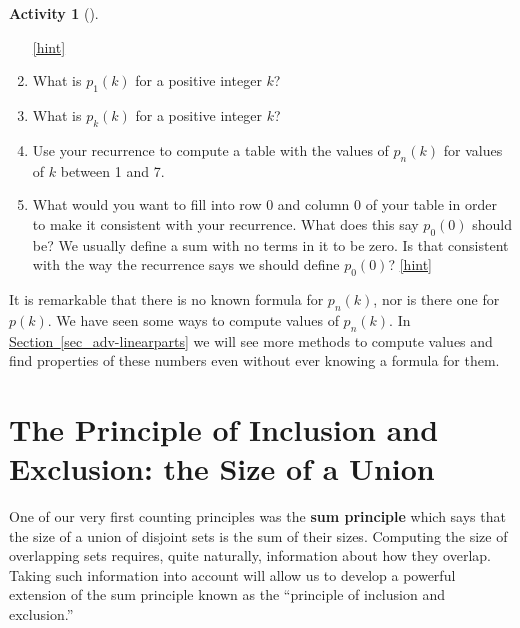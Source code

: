 \documentclass[10pt,]{book}
\newcommand{\terminology}[1]{\textbf{#1}}
\theoremstyle{plain}
\theoremstyle{definition}
\theoremstyle{definition}
\theoremstyle{definition}
\newtheorem{activity}[project]{Activity}
\numberwithin{equation}{chapter}
\begin{document}
\begin{activity}[]
\begin{enumerate}[font=\bfseries,label=(\alph*),ref=\alph*]
\hfill{\tiny\hyperlink{a-215.d}{[hint]}\hypertarget{q-215.d}{}}\item\label{task-221} \hypertarget{p-1156}{}%
What is \(p_1(k)\) for a positive integer \(k\)?%
\item\label{task-222} \hypertarget{p-1158}{}%
What is \(p_k(k)\) for a positive integer \(k\)?%
\item\label{task-223} \hypertarget{p-1160}{}%
Use your recurrence to compute a table with the values of \(p_n(k)\) for values of \(k\) between 1 and 7.%
\item\label{task-224} \hypertarget{p-1161}{}%
What would you want to fill into row 0 and column 0 of your table in order to make it consistent with your recurrence.  What does this say \(p_0(0)\) should be?  We usually define a sum with no terms in it to be zero. Is that consistent with the way the recurrence says we should define \(p_0(0)\)?%
\hfill{\tiny\hyperlink{a-215.h}{[hint]}\hypertarget{q-215.h}{}}\end{enumerate}
\end{activity}
\hypertarget{p-1164}{}%
It is remarkable that there is no known formula for \(p_n(k)\), nor is there one for \(p(k)\). We have seen some ways to compute values of \(p_n(k)\).  In \hyperref[sec_adv-linearparts]{Section~\ref{sec_adv-linearparts}} we will see more methods to compute values and find properties of these numbers even without ever knowing a formula for them.%
\typeout{************************************************}
\typeout{************************************************}
\section[{The Principle of Inclusion and Exclusion: the Size of a Union}]{The Principle of Inclusion and Exclusion: the Size of a Union}\label{sec_adv-pie}
\hypertarget{p-1165}{}%
One of our very first counting principles was the \terminology{sum principle} which says that the size of a union of disjoint sets is the sum of their sizes. Computing the size of overlapping sets requires, quite naturally, information about how they overlap. Taking such information into account will allow us to develop a powerful extension of the sum principle known as the ``principle of inclusion and exclusion.''%
\typeout{************************************************}
\typeout{************************************************}
\end{document}
